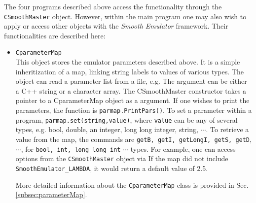 \documentclass[UserManual.tex]{subfiles}
\begin{document}
\begin{sloppypar}
The four programs described above access the functionality through the {\tt CSmoothMaster} object. However, within the main program one may also wish to apply or access other objects with the {\it Smooth Emulator} framework. Their functionalities are described here:
\begin{itemize}\itemsep=0pt
\item {\tt CparameterMap}\\
This object stores the emulator parameters described above. It is a simple inheritization of a map, linking string labels to values of various types. The object can read a parameter list from a file, e.g.
\vspace*{-8pt}{\tt
\begin{Verbatim}[commandchars=\\\{\}]
 CparameterMap parmap;
 parmap.ReadParsFromFile ("smooth_data/smooth_parameters/emulator_parameters.txt")
\end{Verbatim}
}\vspace*{-8pt}
The argument can be either a C++ string or a character array. The CSmoothMaster constructor takes a pointer to a CparameterMap object as a argument. If one wishes to print the parameters, the function is {\tt parmap.PrintPars()}. To set a parameter within a program, {\tt parmap.set(string,value)}, where {\tt value} can be any of several types, e.g. bool, double, an integer, long long integer, string, $\cdots$. To retrieve a value from the map, the commands are {\tt getB, getI, getLongI, getS, getD}, $\cdots$, for {\tt bool, int, long long int} $\cdots$ types. For example, one can access options from the {\tt CSmoothMaster} object via
\vspace*{-8pt}{\tt \begin{Verbatim}[commandchars=\\\{\}]
 double Lambda=master->parmap->getD("SmoothEmulator_LAMBDA",2.5);
\end{Verbatim}
}\vspace*{-8pt}
If the map did not include {\tt SmoothEmulator\_LAMBDA}, it would return a default value of 2.5.

More detailed information about the {\tt CparameterMap} class is provided in Sec. \ref{subsec:parameterMap}.


\end{itemize}
\end{sloppypar}
\end{document}
